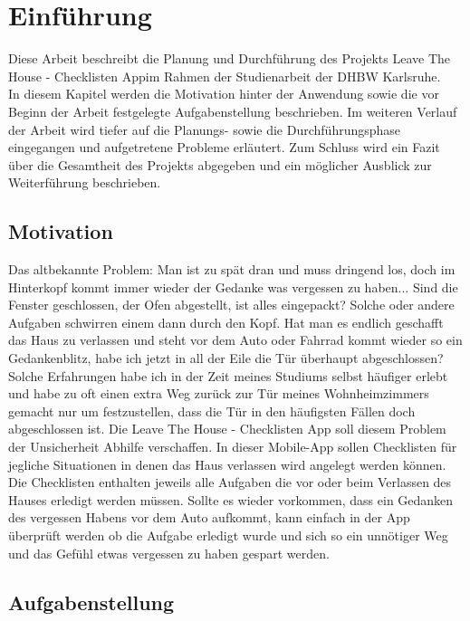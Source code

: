 \chapter{Einführung}\label{chpt:einführung}

Diese Arbeit beschreibt die Planung und Durchführung des Projekts \glqq Leave The House - Checklisten App\grqq im Rahmen der Studienarbeit der \ac{DHBW} Karlsruhe.\\
In diesem Kapitel werden die Motivation hinter der Anwendung sowie die vor Beginn der Arbeit festgelegte Aufgabenstellung beschrieben. Im weiteren Verlauf der Arbeit wird tiefer auf die Planungs- sowie die Durchführungsphase eingegangen und aufgetretene Probleme erläutert. Zum Schluss wird ein Fazit über die Gesamtheit des Projekts abgegeben und ein möglicher Ausblick zur Weiterführung beschrieben.

\section{Motivation}\label{sec:motivation}

Das altbekannte Problem: Man ist zu spät dran und muss dringend los, doch im Hinterkopf kommt immer wieder der Gedanke was vergessen zu haben... Sind die Fenster geschlossen, der Ofen abgestellt, ist alles eingepackt? Solche oder andere Aufgaben schwirren einem dann durch den Kopf. Hat man es endlich geschafft das Haus zu verlassen und steht vor dem Auto oder Fahrrad kommt wieder so ein Gedankenblitz, habe ich jetzt in all der Eile die Tür überhaupt abgeschlossen?\\
Solche Erfahrungen habe ich in der Zeit meines Studiums selbst häufiger erlebt und habe zu oft einen extra Weg zurück zur Tür meines Wohnheimzimmers gemacht nur um festzustellen, dass die Tür in den häufigsten Fällen doch abgeschlossen ist. Die \glqq Leave The House - Checklisten App\grqq{} soll diesem Problem der Unsicherheit Abhilfe verschaffen. In dieser Mobile-App sollen Checklisten für jegliche Situationen in denen das Haus verlassen wird angelegt werden können. Die Checklisten enthalten jeweils alle Aufgaben die vor oder beim Verlassen des Hauses erledigt werden müssen. Sollte es wieder vorkommen, dass ein Gedanken des vergessen Habens vor dem Auto aufkommt, kann einfach in der App überprüft werden ob die Aufgabe erledigt wurde und sich so ein unnötiger Weg und das Gefühl etwas vergessen zu haben gespart werden.

\section{Aufgabenstellung}\label{sec:Aufgabenstellung}

